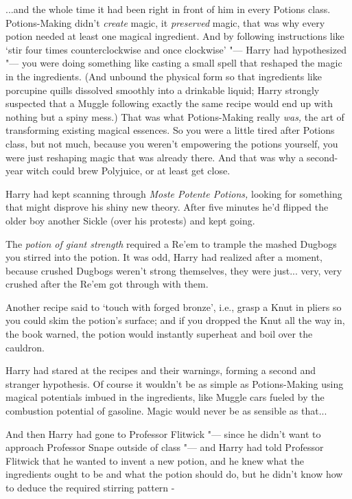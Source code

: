 ...and the whole time it had been right in front of him in every
Potions class. Potions-Making didn't \emph{create} magic, it
\emph{preserved} magic, that was why every potion needed at least one
magical ingredient. And by following instructions like `stir four times
counterclockwise and once clockwise' "--- Harry had hypothesized "--- you were
doing something like casting a small spell that reshaped the magic in
the ingredients. (And unbound the physical form so that ingredients like
porcupine quills dissolved smoothly into a drinkable liquid; Harry
strongly suspected that a Muggle following exactly the same recipe would
end up with nothing but a spiny mess.) That was what Potions-Making
really \emph{was,} the art of transforming existing magical essences. So
you were a little tired after Potions class, but not much, because you
weren't empowering the potions yourself, you were just reshaping magic
that was already there. And that was why a second-year witch could brew
Polyjuice, or at least get close.

Harry had kept scanning through \emph{Moste Potente Potions,} looking
for something that might disprove his shiny new theory. After five
minutes he'd flipped the older boy another Sickle (over his protests)
and kept going.

The \emph{potion of giant strength} required a Re'em to trample the
mashed Dugbogs you stirred into the potion. It was odd, Harry had
realized after a moment, because crushed Dugbogs weren't strong
themselves, they were just... very, very crushed after the Re'em
got through with them.

Another recipe said to `touch with forged bronze', i.e., grasp a Knut in
pliers so you could skim the potion's surface; and if you dropped the
Knut all the way in, the book warned, the potion would instantly
superheat and boil over the cauldron.

Harry had stared at the recipes and their warnings, forming a second and
stranger hypothesis. Of course it wouldn't be as simple as
Potions-Making using magical potentials imbued in the ingredients, like
Muggle cars fueled by the combustion potential of gasoline. Magic would
never be as sensible as that...

And then Harry had gone to Professor Flitwick "--- since he didn't want to
approach Professor Snape outside of class "--- and Harry had told Professor
Flitwick that he wanted to invent a new potion, and he knew what the
ingredients ought to be and what the potion should do, but he didn't
know how to deduce the required stirring pattern -

